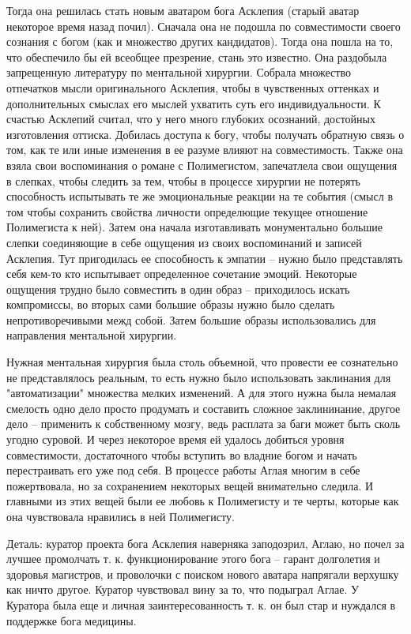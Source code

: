 \documentclass[12pt,a4paper]{article}
\begin{document}
Тогда она решилась стать новым аватаром бога Асклепия (старый аватар некоторое время назад почил). Сначала она не подошла по совместимости своего сознания с богом (как и множество других кандидатов). Тогда она пошла на то, что обеспечило бы ей всеобщее презрение, стань это известно. Она раздобыла запрещенную литературу по ментальной хирургии. Собрала множество отпечатков мысли оригинального Асклепия, чтобы в чувственных оттенках и дополнительных смыслах его мыслей ухватить суть его индивидуальности. К счастью Асклепий считал, что у него много глубоких осознаний, достойных изготовления оттиска. Добилась доступа к богу, чтобы получать обратную связь о том, как те или иные изменения в ее разуме влияют на совместимость. Также она взяла свои воспоминания о романе с Полимегистом, запечатлела свои ощущения в слепках, чтобы следить за тем, чтобы в процессе хирургии не потерять способность испытывать те же эмоциональные реакции на те события (смысл в том чтобы сохранить свойства личности определющие текущее отношение Полимегиста к ней). Затем она начала изготавливать монументально большие слепки соединяющие в себе ощущения из своих воспоминаний и записей Асклепия. Тут пригодилась ее способность к эмпатии -- нужно было представлять себя кем-то кто испытывает определенное сочетание эмоций. Некоторые ощущения трудно было совместить в один образ -- приходилось искать компромиссы, во вторых сами большие образы нужно было сделать непротиворечивыми межд собой. Затем большие образы использовались для направления ментальной хирургии.

Нужная ментальная хирургия была столь объемной, что провести ее сознательно не представлялось реальным, то есть нужно было использовать заклинания для "автоматизации" множества мелких изменений. А для этого нужна была немалая смелость одно дело просто продумать и составить сложное заклининание, другое дело -- применить к собственному мозгу, ведь расплата за баги может быть сколь угодно суровой. И через некоторое время ей удалось добиться уровня совместимости, достаточного чтобы вступить во владние богом и начать перестраивать его уже под себя. В процессе работы Аглая многим в себе пожертвовала, но за сохранением некоторых вещей внимательно следила. И главными из этих вещей были ее любовь к Полимегисту и те черты, которые как она чувствовала нравились в ней Полимегисту.

Деталь: куратор проекта бога Асклепия наверняка заподозрил, Аглаю, но почел за лучшее промолчать т. к. функционирование этого бога -- гарант долголетия и здоровья магистров, и проволочки с поиском нового аватара напрягали верхушку как ничто другое. Куратор чувствовал вину за то, что подыграл Аглае. У Куратора была еще и личная заинтересованность т. к. он был стар и нуждался в поддержке бога медицины.
\end{document}

